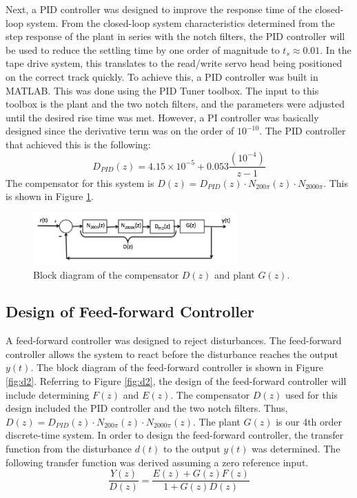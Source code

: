 \documentclass[11pt]{article}
\begin{document}
Next, a PID controller was designed to improve the response time of the closed-loop system. From the closed-loop system characteristics determined from the step response of the plant in series with the notch filters, the PID controller will be used to reduce the settling time by one order of magnitude to $t_{s} \approx 0.01$. In the tape drive system, this translates to the read/write servo head being positioned on the correct track quickly. To achieve this, a PID controller was built in MATLAB. This was done using the PID Tuner toolbox. The input to this toolbox is the plant and the two notch filters, and the parameters were adjusted until the desired rise time was met. However, a PI controller was basically designed since the derivative term was on the order of $10^{-10}$. The PID controller that achieved this is the following:
\[ D_{PID}(z) = 4.15\times10^{-5} + 0.053\frac{(10^{-4})}{z-1}  \]
The compensator for this system is $D(z) = D_{PID}(z) \cdot N_{200\pi}(z) \cdot N_{2000\pi}$. This is shown in Figure \ref{fig:dzComp}.
\begin{figure}[H]
    \centering
    \includegraphics[width=0.7\textwidth]{DzComp.png}
    \caption{Block diagram of the compensator $D(z)$ and plant $G(z)$.}
    \label{fig:dzComp}
\end{figure}

\subsection{Design of Feed-forward Controller}
A feed-forward controller was designed to reject disturbances. The feed-forward controller allows the system to react before the disturbance reaches the output $y(t)$. The block diagram of the feed-forward controller is shown in Figure \ref{fig:d2}. Referring to Figure \ref{fig:d2}, the design of the feed-forward controller will include determining $F(z)$ and $E(z)$. The compensator $D(z)$ used for this design included the PID controller and the two notch filters. Thus, $D(z) = D_{PID}(z)\cdot N_{200\pi}(z) \cdot N_{2000\pi}(z)$. The plant $G(z)$ is our 4th order discrete-time system. In order to design the feed-forward controller, the transfer function from the disturbance $d(t)$ to the output $y(t)$ was determined. The following transfer function was derived assuming a zero reference input.
\[ \frac{Y(z)}{D(z)} = \frac{E(z) + G(z)F(z)}{1+G(z)D(z)} \]
\end{document}
